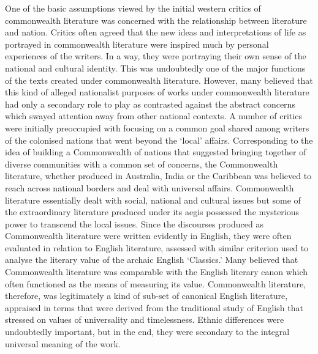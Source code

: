 One  of  the  basic  assumptions  viewed  by  the  initial  western  critics  of  commonwealth  literature  was  concerned  with  the  relationship  between  literature  and  nation.  Critics  often  agreed  that  the  new  ideas  and  interpretations  of  life  as  portrayed  in  commonwealth  literature  were  inspired  much  by  personal  experiences  of  the  writers.  In  a  way,  they  were  portraying  their  own  sense  of  the  national  and  cultural  identity.  This  was  undoubtedly  one  of  the  major  functions  of  the  texts  created  under  commonwealth  literature.  However,  many  believed  that  this  kind  of  alleged  nationalist  purposes  of  works  under  commonwealth  literature  had  only  a  secondary  role  to  play  as  contrasted  against  the  abstract  concerns  which  swayed  attention  away  from  other  national  contexts.  A  number  of  critics  were  initially  preoccupied  with  focusing  on  a  common  goal  shared  among  writers  of  the  colonised  nations  that  went  beyond  the  ‘local’  affairs.  Corresponding  to  the  idea  of  building  a  Commonwealth  of  nations  that  suggested  bringing  together  of  diverse  communities  with  a  common  set  of  concerns,  the  Commonwealth  literature,  whether  produced  in  Australia,  India  or  the  Caribbean  was  believed  to  reach  across  national  borders  and  deal  with  universal  affairs.  Commonwealth  literature  essentially  dealt  with  social,  national  and  cultural  issues  but  some  of  the  extraordinary  literature  produced  under  its  aegis  possessed  the  mysterious  power  to  transcend  the  local  issues.  Since  the  discourses  produced  as  Commonwealth  literature  were  written  evidently  in  English,  they  were  often  evaluated  in  relation  to  English  literature,  assessed  with  similar  criterion  used  to  analyse  the  literary  value  of  the  archaic  English  ‘Classics.’  Many  believed  that  Commonwealth  literature  was  comparable  with  the  English  literary  canon  which  often  functioned  as  the  means  of  measuring  its  value.  Commonwealth  literature,  therefore,  was  legitimately  a  kind  of  sub-set  of  canonical  English  literature,  appraised  in  terms  that  were  derived  from  the  traditional  study  of  English  that  stressed  on  values  of  universality  and  timelessness.  Ethnic  differences  were  undoubtedly  important,  but  in  the  end,  they  were  secondary  to  the  integral  universal  meaning  of  the  work.  

